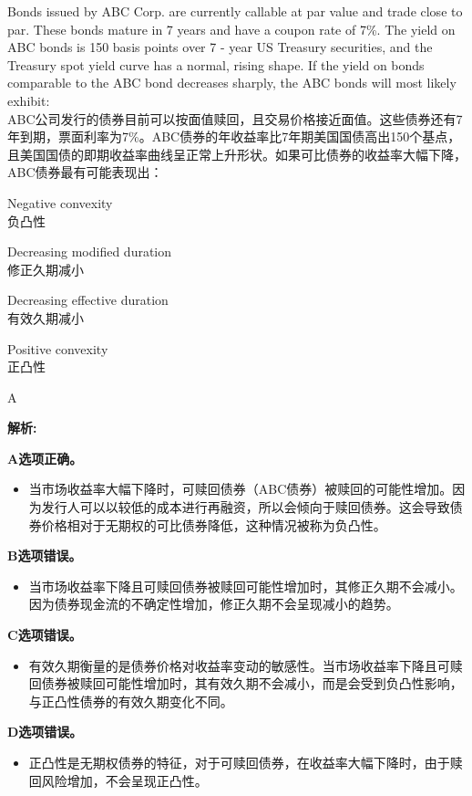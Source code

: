 \documentclass{article}
\newcounter{question} %
\newenvironment{explanation}
{\textbf{解析:}\par}
{\par}
\begin{document}
\begin{question}
    Bonds issued by ABC Corp. are currently callable at par value and trade close to par. These bonds mature in 7 years and have a coupon rate of 7\%. The yield on ABC bonds is 150 basis points over 7 - year US Treasury securities, and the Treasury spot yield curve has a normal, rising shape. If the yield on bonds comparable to the ABC bond decreases sharply, the ABC bonds will most likely exhibit:
    \\ABC公司发行的债券目前可以按面值赎回，且交易价格接近面值。这些债券还有7年到期，票面利率为7\%。ABC债券的年收益率比7年期美国国债高出150个基点，且美国国债的即期收益率曲线呈正常上升形状。如果可比债券的收益率大幅下降，ABC债券最有可能表现出：
    \end{question}
    
    \begin{choices}
        \item Negative convexity\\
        负凸性
        \item Decreasing modified duration\\
        修正久期减小
        \item Decreasing effective duration\\
        有效久期减小
        \item Positive convexity\\
        正凸性
    \end{choices}
    
    \begin{correctanswer}
        A
    \end{correctanswer}
    
    \begin{explanation}
    \textbf{A选项正确。}
    \begin{itemize}
    \item 当市场收益率大幅下降时，可赎回债券（ABC债券）被赎回的可能性增加。因为发行人可以以较低的成本进行再融资，所以会倾向于赎回债券。这会导致债券价格相对于无期权的可比债券降低，这种情况被称为负凸性。
    \end{itemize}
    \textbf{B选项错误。}
    \begin{itemize}
    \item 当市场收益率下降且可赎回债券被赎回可能性增加时，其修正久期不会减小。因为债券现金流的不确定性增加，修正久期不会呈现减小的趋势。
    \end{itemize}
    \textbf{C选项错误。}
    \begin{itemize}
    \item 有效久期衡量的是债券价格对收益率变动的敏感性。当市场收益率下降且可赎回债券被赎回可能性增加时，其有效久期不会减小，而是会受到负凸性影响，与正凸性债券的有效久期变化不同。 
    \end{itemize}
    \textbf{D选项错误。}
    \begin{itemize}
    \item 正凸性是无期权债券的特征，对于可赎回债券，在收益率大幅下降时，由于赎回风险增加，不会呈现正凸性。
    \end{itemize}
    \end{explanation}
    
\end{document}
